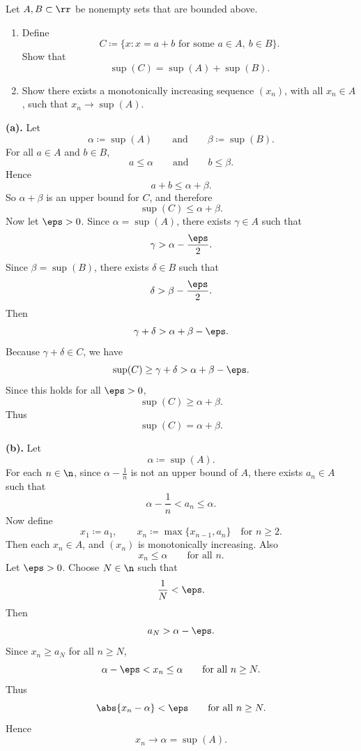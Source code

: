\begin{problem}{
    Let $A,B\subset\rr$ be nonempty sets that are bounded above.
    \begin{enumerate}[label={(\alph*)}]
\item Define
\[
    C\coloneqq\{x:x=a+b\text{ for some }a\in A,\ b\in B\}.
\]
Show that
\[
    \sup(C)=\sup(A)+\sup(B).
\]
\item Show there exists a monotonically increasing sequence $(x_n)$, with all $x_n\in A$, such that $x_n\to\sup(A)$.
    \end{enumerate}
}
    \textbf{(a).}
    Let
    \[
        \alpha\coloneqq\sup(A)
        \qquad\text{and}\qquad
        \beta\coloneqq\sup(B).
    \]
    For all $a\in A$ and $b\in B$,
    \[
        a\leq\alpha
        \qquad\text{and}\qquad
        b\leq\beta.
    \]
    Hence
    \[
        a+b\leq\alpha+\beta.
    \]
    So $\alpha+\beta$ is an upper bound for $C$, and therefore
    \[
        \sup(C)\leq\alpha+\beta.
    \]
    Now let $\eps>0$.
    Since $\alpha=\sup(A)$, there exists $\gamma\in A$ such that
    \[
        \gamma>\alpha-\frac{\eps}{2}.
    \]
    Since $\beta=\sup(B)$, there exists $\delta\in B$ such that
    \[
        \delta>\beta-\frac{\eps}{2}.
    \]
    Then
    \[
        \gamma+\delta>\alpha+\beta-\eps.
    \]
    Because $\gamma+\delta\in C$, we have
    \[
        \sup(C)\geq\gamma+\delta>\alpha+\beta-\eps.
    \]
    Since this holds for all $\eps>0$,
    \[
        \sup(C)\geq\alpha+\beta.
    \]
    Thus
    \[
        \sup(C)=\alpha+\beta.
    \]

    \textbf{(b).}
    Let
    \[
        \alpha\coloneqq\sup(A).
    \]
    For each $n\in\n$, since $\alpha-\frac1n$ is not an upper bound of $A$, there exists $a_n\in A$ such that
    \[
        \alpha-\frac1n<a_n\leq\alpha.
    \]
    Now define
    \[
        x_1\coloneqq a_1,
        \qquad
        x_n\coloneqq\max\{x_{n-1},a_n\}\quad\text{for }n\geq2.
    \]
    Then each $x_n\in A$, and $(x_n)$ is monotonically increasing.
    Also
    \[
        x_n\leq\alpha
        \qquad\text{for all }n.
    \]
    Let $\eps>0$.
    Choose $N\in\n$ such that
    \[
        \frac1N<\eps.
    \]
    Then
    \[
        a_N>\alpha-\eps.
    \]
    Since $x_n\geq a_N$ for all $n\geq N$,
    \[
        \alpha-\eps<x_n\leq\alpha
        \qquad\text{for all }n\geq N.
    \]
    Thus
    \[
        \abs{x_n-\alpha}<\eps
        \qquad\text{for all }n\geq N.
    \]
    Hence
    \[
        x_n\to\alpha=\sup(A).
    \]
\end{problem}

